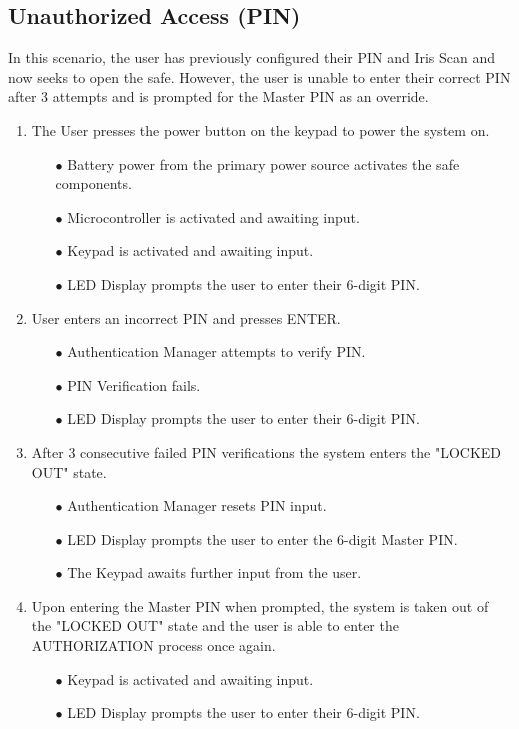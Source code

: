 \documentclass{article}
\begin{document}
\subsection{Unauthorized Access (PIN)}
In this scenario, the user has previously configured their PIN and Iris Scan and now seeks to open the safe. However, the user is unable to enter their correct PIN after 3 attempts and is prompted for the Master PIN as an override.

\begin{enumerate}
    \item The User presses the power button on the keypad to power the system on.
    \begin{enumerate}
        \item[$\bullet$] Battery power from the primary power source activates the safe components.
        \item[$\bullet$] Microcontroller is activated and awaiting input.
        \item[$\bullet$] Keypad is activated and awaiting input.
        \item[$\bullet$] LED Display prompts the user to enter their 6-digit PIN.
    \end{enumerate}
    \item User enters an incorrect PIN and presses ENTER.
    \begin{enumerate}
        \item[$\bullet$] Authentication Manager attempts to verify PIN.
        \item[$\bullet$] PIN Verification fails.
        \item[$\bullet$] LED Display prompts the user to enter their 6-digit PIN.
    \end{enumerate}
     \item After 3 consecutive failed PIN verifications the system enters the "LOCKED OUT" state.
    \begin{enumerate}
        \item[$\bullet$] Authentication Manager resets PIN input.
        \item[$\bullet$] LED Display prompts the user to enter the 6-digit Master PIN.
        \item[$\bullet$] The Keypad awaits further input from the user.
    \end{enumerate}
    \item Upon entering the Master PIN when prompted, the system is taken out of the "LOCKED OUT" state and the user is able to enter the AUTHORIZATION process once again.
    \begin{enumerate}
        \item[$\bullet$] Keypad is activated and awaiting input.
        \item[$\bullet$] LED Display prompts the user to enter their 6-digit PIN.
    \end{enumerate}
\end{enumerate}
\end{document}

